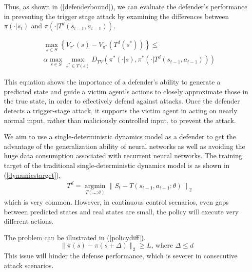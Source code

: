 \documentclass[letterpaper, 10 pt, conference]{ieeeconf}  %
\begin{document}
Thus, as shown in (\ref{defenderbound}), we can evaluate the defender's performance in preventing the trigger stage attack by examining the differences between $\pi(\cdot| s_{t})$ and $\pi (\cdot| T^d(s_{t-1},a_{t-1}))$.

\begin{equation}\label{defenderbound}
\begin{aligned}
    &\max _{s \in S}\left\{V_{\pi^*}(s)-V_{\pi^*}(T^d(s^*))\right\} \leq \\ &\alpha \max _{s \in S}\max _{s^* \in T(s)} D_{TV}(\pi^*(\cdot| s), \pi^* (\cdot| T^d(s_{t-1},a_{t-1})))
\end{aligned}
\end{equation}



This equation shows the importance of a defender's ability to generate a predicted state and guide a victim agent's actions to closely approximate those in the true state, in order to effectively defend against attacks. Once the defender detects a trigger-stage attack, it supports the victim agent in acting on nearly normal input, rather than maliciously controlled input, to prevent the attack.

We aim to use a single-deterministic dynamics model as a defender to get the advantage of the generalization ability of neural networks as well as avoiding the huge data consumption associated with recurrent neural networks. The training target of the traditional single-deterministic dynamics model is as shown in (\ref{dynamicstarget}),
\begin{eqnarray}
\label{dynamicstarget}
&T^d=\underset{T(\ldots;\theta)}{\operatorname{argmin}}\left\|S_t-T\left(s_{t-1}, a_{t-1};\theta\right)\right\|_2
\end{eqnarray}
which is very common. However, in continuous control scenarios, even gaps between predicted states and real states are small, the policy will execute very different actions.

The problem can be illustrated in (\ref{policydiff}). 
\begin{equation}\label{policydiff}
\|\pi(s)-\pi(s+\Delta)\|_2 \geq L \text {, where } \Delta \leq d
\end{equation}
This issue will hinder the defense performance, which is severer in consecutive attack scenarios. 
\end{document}
